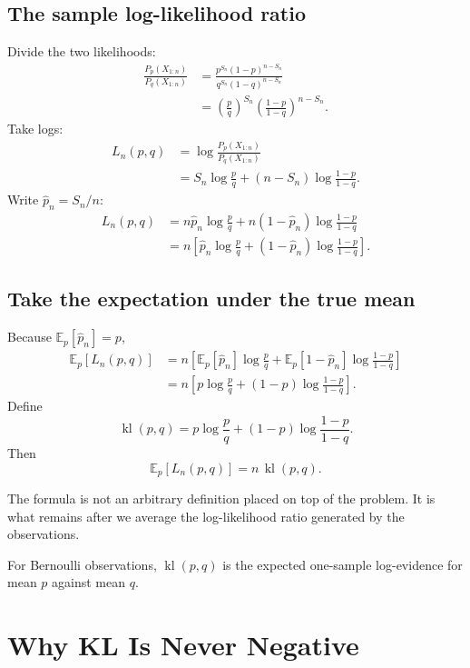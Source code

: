 \documentclass[en,nofont,11pt]{elegantbook}
\newcommand{\E}{\mathbb{E}}
\newcommand{\kl}{\operatorname{kl}}
\begin{document}
\section{The sample log-likelihood ratio}

Divide the two likelihoods:
\begin{align*}
\frac{P_p(X_{1:n})}{P_q(X_{1:n})}
&=
\frac{p^{S_n}(1-p)^{n-S_n}}
{q^{S_n}(1-q)^{n-S_n}}\\
&=
\left(\frac{p}{q}\right)^{S_n}
\left(\frac{1-p}{1-q}\right)^{n-S_n}.
\end{align*}
Take logs:
\begin{align*}
L_n(p,q)
&=
\log\frac{P_p(X_{1:n})}{P_q(X_{1:n})}\\
&=
S_n\log\frac{p}{q}
+
(n-S_n)\log\frac{1-p}{1-q}.
\end{align*}
Write $\widehat p_n=S_n/n$:
\begin{align*}
L_n(p,q)
&=
n\widehat p_n\log\frac{p}{q}
+n(1-\widehat p_n)\log\frac{1-p}{1-q}\\
&=
n\left[
\widehat p_n\log\frac{p}{q}
+(1-\widehat p_n)\log\frac{1-p}{1-q}
\right].
\end{align*}

\section{Take the expectation under the true mean}

Because $\E_p[\widehat p_n]=p$,
\begin{align*}
\E_p[L_n(p,q)]
&=
n\left[
\E_p[\widehat p_n]\log\frac{p}{q}
+
\E_p[1-\widehat p_n]\log\frac{1-p}{1-q}
\right]\\
&=
n\left[
p\log\frac{p}{q}
+
(1-p)\log\frac{1-p}{1-q}
\right].
\end{align*}
Define
\[
\boxed{
\kl(p,q)
=
p\log\frac{p}{q}
+(1-p)\log\frac{1-p}{1-q}.
}
\]
Then
\[
\boxed{
\E_p[L_n(p,q)]
=
n\,\kl(p,q).
}
\]

The formula is not an arbitrary definition placed on top of the problem. It is what remains after we average the log-likelihood ratio generated by the observations.

\begin{resultbox}
For Bernoulli observations, $\kl(p,q)$ is the expected one-sample log-evidence for mean $p$ against mean $q$.
\end{resultbox}

\chapter{Why KL Is Never Negative}
\end{document}
